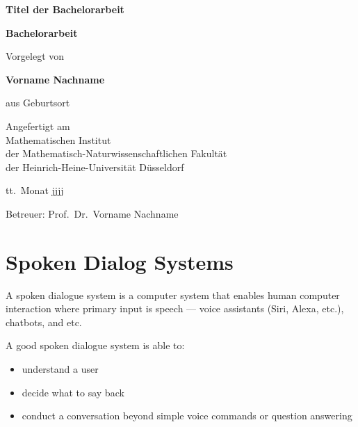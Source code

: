\documentclass[12pt,titlepage,a4paper]{article}
\begin{document}
\begin{titlepage}
\begin{center}

\textbf{\LARGE Titel der Bachelorarbeit}

\bigskip\bigskip
\textbf{Bachelorarbeit}

\bigskip\bigskip\bigskip
Vorgelegt von

\bigskip
\textbf{Vorname Nachname}

\bigskip
aus Geburtsort


\vfill
Angefertigt am\\
Mathematischen Institut\\ 
der Mathematisch-Naturwissenschaftlichen Fakult\"at\\ 
der Heinrich-Heine-Universit\"at D\"usseldorf

\bigskip
tt.\ Monat jjjj

\bigskip
Betreuer: Prof.\ Dr.\ Vorname Nachname

\end{center}
\end{titlepage}

\thispagestyle{empty}\mbox{}
\setcounter{page}{0}

\tableofcontents

\pagebreak
\section{Spoken Dialog Systems}
A spoken dialogue system is a computer system that enables human computer interaction where primary input is speech --- voice assistants (Siri, Alexa, etc.), chatbots, and etc. \par

A good spoken dialogue system is able to:
\begin{itemize}
     \item understand a user
     \item decide what to say back
     \item conduct a conversation beyond simple voice commands or question answering
\end{itemize}
\end{document}
